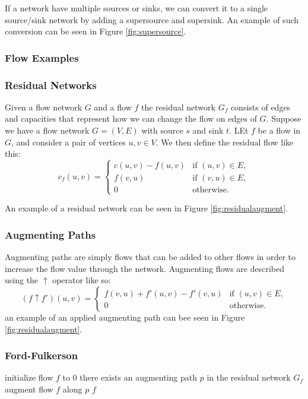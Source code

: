 If a network have multiple sources or sinks, we can convert it to a single
source/sink network by adding a supersource and supersink. An example of such
conversion can be seen in Figure \ref{fig:supersource}.

\subsubsection{Flow Examples}

\subsubsection{Residual Networks}
Given a flow network $G$ and a flow $f$ the residual network $G_f$ consists of
edges and capacities that represent how we can change the flow on edges of $G$.
Suppose we have a flow network $G=(V,E)$ with source $s$ and sink $t$. LEt $f$
be a flow in $G$, and consider a pair of vertices $u,v \in V$. We then define
the residual flow like this:
\[
  c_f(u,v) =
  \begin{cases}
    c(u,v) - f(u,v) & \text{if } (u,v) \in E, \\
    f(v,u)          & \text{if } (v,u) \in E, \\
    0               & \text{otherwise}.
  \end{cases}
\]


An example of a residual network can be seen in Figure
\ref{fig:residualaugment}.


\subsubsection{Augmenting Paths}
Augmenting paths are simply flows that can be added to other flows in order to
increase the flow value through the network. Augmenting flows are described
using the $\uparrow$ operator like so:
\[
  (f\uparrow f')(u,v) =
  \begin{cases}
    f(v,u)+f'(u,v) - f'(v,u) & \text{if } (u,v) \in E, \\
    0                        & \text{otherwise}.
  \end{cases}
\]
an example of an applied augmenting path can bee seen in Figure
\ref{fig:residualaugment}.

\subsubsection{Ford-Fulkerson}
\begin{codebox}
\li initialize flow $f$ to 0
\li \While there exists an augmenting path $p$ in the residual network $G_f$
    \Do
\li      augment flow $f$ along $p$
    \End
\li \Return $f$
\end{codebox}